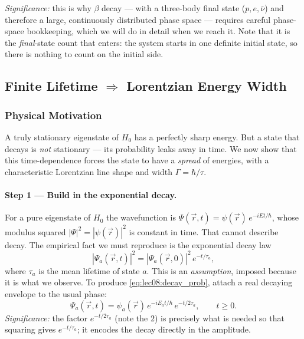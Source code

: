 \textit{Significance:} this is why $\beta$ decay --- with a three-body final
state ($p,e,\bar\nu$) and therefore a large, continuously distributed phase space
--- requires careful phase-space bookkeeping, which we will do in detail when we
reach it.  Note that it is the \emph{final}-state count that enters: the system
starts in one definite initial state, so there is nothing to count on the
initial side.

\subsection{Finite Lifetime $\Rightarrow$ Lorentzian Energy Width}
\label{subsec:lec08:width}

\subsubsection*{Physical Motivation}
A truly stationary eigenstate of $H_0$ has a perfectly sharp energy.  But a state
that decays is \emph{not} stationary --- its probability leaks away in time.  We
now show that this time-dependence forces the state to have a \emph{spread} of
energies, with a characteristic Lorentzian line shape and width
$\Gamma = \hbar/\tau$.

\paragraph{Step 1 --- Build in the exponential decay.}
For a pure eigenstate of $H_0$ the wavefunction is
$\Psi(\vec r,t) = \psi(\vec r)\,e^{-iEt/\hbar}$, whose modulus squared
$|\Psi|^2 = |\psi(\vec r)|^2$ is constant in time.  That cannot describe decay.
The empirical fact we must reproduce is the exponential decay law
\begin{equation}
  \label{eq:lec08:decay_prob}
  |\Psi_a(\vec r,t)|^2 = |\Psi_a(\vec r,0)|^2\,e^{-t/\tau_a},
\end{equation}
where $\tau_a$ is the mean lifetime of state $a$.  This is an \emph{assumption},
imposed because it is what we observe.  To produce \eqref{eq:lec08:decay_prob},
attach a real decaying envelope to the usual phase:
\begin{equation}
  \label{eq:lec08:decay_wf}
  \boxed{\Psi_a(\vec r,t) = \psi_a(\vec r)\,e^{-iE_a t/\hbar}\,e^{-t/2\tau_a},
         \qquad t \geq 0.}
\end{equation}
\textit{Significance:} the factor $e^{-t/2\tau_a}$ (note the $2$) is precisely
what is needed so that squaring gives $e^{-t/\tau_a}$; it encodes the decay
directly in the amplitude.

